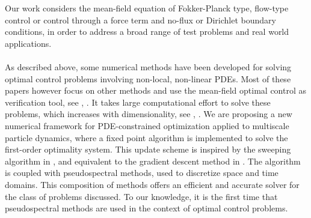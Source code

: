 Our work considers the mean-field equation of Fokker-Planck type, flow-type control or control through a force term and no-flux or Dirichlet boundary conditions, in order to address a broad range of test problems and real world applications. 
\\
\\
As described above, some numerical methods have been developed for solving optimal control problems involving non-local, non-linear PDEs. Most of these papers however focus on other methods and use the mean-field optimal control as verification tool, see \cite{Pinnau_2017}, \cite{albi2016mean}. It takes large computational effort to solve these problems, which increases with dimensionality, see \cite{burger2019instantaneous}, \cite{burger2016controlling}. 
We are proposing a new numerical framework for PDE-constrained optimization applied to multiscale particle dynamics, where a fixed point algorithm is implemented to solve the first-order optimality system. This update scheme is inspired by the sweeping algorithm in \cite{albi2016mean}, and equivalent to the gradient descent method in \cite{Burger1}. The algorithm is coupled with pseudospectral methods, used to discretize space and time domains. This composition of methods offers an efficient and accurate solver for the class of problems discussed. To our knowledge, it is the first time that pseudospectral methods are used in the context of optimal control problems.









